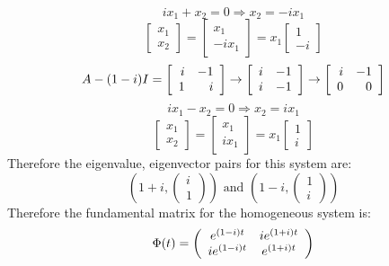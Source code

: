 \documentclass[12pt,letterpaper,reqno]{amsart}
\begin{document}
\begin{enumerate}
\begin{enumerate}
\begin{flushleft}
    $$ix_1 + x_2 = 0 \Rightarrow x_2 = -ix_1$$
    $$\left[ \begin{array} { r } { x_1 } \\ { x_2 } \end{array} \right] = \left[ \begin{array} { r } { x_1 } \\ { -ix_1 } \end{array} \right] = x_1 \left[ \begin{array} { r } { 1 } \\ { -i } \end{array} \right]$$
    $$A-(1-i)I = \left[ \begin{array} { r r } { i } & { -1 } \\ { 1 } & { i } \end{array} \right] \rightarrow \left[ \begin{array} { r r } { i } & { -1 } \\ { i } & { -1 } \end{array} \right] \rightarrow \left[ \begin{array} { r r } { i } & { -1 } \\ { 0 } & { 0 } \end{array} \right]$$
    $$ix_1 - x_2 = 0 \Rightarrow x_2 = ix_1$$
    $$\left[ \begin{array} { r } { x_1 } \\ { x_2 } \end{array} \right] = \left[ \begin{array} { r } { x_1 } \\ { ix_1 } \end{array} \right] = x_1 \left[ \begin{array} { r } { 1 } \\ { i } \end{array} \right]$$
    Therefore the eigenvalue, eigenvector pairs for this system are:
    $$\left(1+i,\left( \begin{array} { r } { i } \\ { 1 } \end{array} \right)\right) \text{ and } \left(1-i,\left( \begin{array} { r } { 1 } \\ { i } \end{array} \right)\right)$$
    Therefore the fundamental matrix for the homogeneous system is:
    $$\Phi(t) = \left( \begin{array} { c c } { e ^ { (1-i)t } } & { ie ^ { (1+i)t } } \\ { ie ^ { (1-i)t } } & { e ^ { (1+i)t } } \end{array} \right)$$

\end{flushleft}
\end{enumerate}
\end{enumerate}
\end{document}
